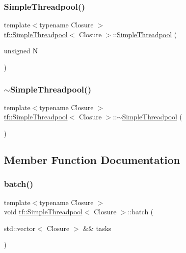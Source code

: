\subsubsection{\texorpdfstring{Simple\+Threadpool()}{SimpleThreadpool()}}
{\footnotesize\ttfamily template$<$typename Closure $>$ \\
\hyperlink{classtf_1_1SimpleThreadpool}{tf\+::\+Simple\+Threadpool}$<$ Closure $>$\+::\hyperlink{classtf_1_1SimpleThreadpool}{Simple\+Threadpool} (\begin{DoxyParamCaption}\item[{unsigned}]{N }\end{DoxyParamCaption})\hspace{0.3cm}{\ttfamily [explicit]}}

\mbox{\label{classtf_1_1SimpleThreadpool_a673036c638ce061385c00a9f37c2151d}} 
\subsubsection{\texorpdfstring{$\sim$\+Simple\+Threadpool()}{~SimpleThreadpool()}}
{\footnotesize\ttfamily template$<$typename Closure $>$ \\
\hyperlink{classtf_1_1SimpleThreadpool}{tf\+::\+Simple\+Threadpool}$<$ Closure $>$\+::$\sim$\hyperlink{classtf_1_1SimpleThreadpool}{Simple\+Threadpool} (\begin{DoxyParamCaption}{ }\end{DoxyParamCaption})}



\subsection{Member Function Documentation}
\mbox{\label{classtf_1_1SimpleThreadpool_a30d6487677a85bdbe908d473ef9a9579}} 
\subsubsection{\texorpdfstring{batch()}{batch()}}
{\footnotesize\ttfamily template$<$typename Closure $>$ \\
void \hyperlink{classtf_1_1SimpleThreadpool}{tf\+::\+Simple\+Threadpool}$<$ Closure $>$\+::batch (\begin{DoxyParamCaption}\item[{std\+::vector$<$ Closure $>$ \&\&}]{tasks }\end{DoxyParamCaption})}

